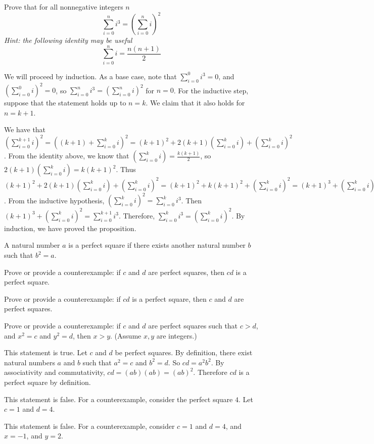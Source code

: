 \documentclass[solution, letterpaper]{cs20}
\begin{document}
Prove that for all nonnegative integers $n$
\[ \sum_{i=0}^{n}i^{3}=\left( \sum_{i=0}^{n}i \right)^{2} \]
{\em Hint: the following identity may be useful}
\[ \sum_{i=0}^ni=\frac{n(n+1)}{2} \]

\begin{solution}
  
We will proceed by induction. As a base case, note that $\sum_{i=0}^0 i^3 = 0$, and 
$\left( \sum_{i=0}^{0}i \right)^{2} = 0$, so $\sum_{i=0}^{n}i^{3}=\left( \sum_{i=0}^{n}i \right)^{2}$ for $n = 0$. For the inductive step, suppose that the statement holds up to $n = k$. We claim that it also holds for $n = k+1$.

We have that $\left( \sum_{i=0}^{k+1}i \right)^{2} = \left((k+1)+ \sum_{i=0}^{k}i \right)^{2} = (k+1)^2 + 2(k+1)(\sum_{i=0}^{k}i) + (\sum_{i=0}^{k}i)^2$. From the identity above, we know that $(\sum_{i=0}^{k}i) = \frac{k(k+1)}{2}$, so $2(k+1)(\sum_{i=0}^{k}i) = k(k+1)^2$. Thus $(k+1)^2 + 2(k+1)(\sum_{i=0}^{k}i) + (\sum_{i=0}^{k}i)^2 = (k+1)^2 + k(k+1)^2 + (\sum_{i=0}^{k}i)^2 = (k+1)^3 + (\sum_{i=0}^{k}i)^2$. From the inductive hypothesis, $(\sum_{i=0}^{k}i)^2 = \sum_{i=0}^{k}i^{3}$. Then $(k+1)^3 + (\sum_{i=0}^{k}i)^2 = \sum_{i=0}^{k+1}i^{3}$. Therefore, $\sum_{i=0}^{k}i^{3}=\left( \sum_{i=0}^{k}i \right)^{2}$. By induction, we have proved the proposition.  
  
\end{solution}

A natural number $a$ is a perfect square if there exists another natural number $b$ such that $b^2 = a$.

\subproblem Prove or provide a counterexample: if $c$ and $d$ are perfect squares, then $cd$ is a perfect square.

\subproblem Prove or provide a counterexample: if $cd$ is a perfect square, then $c$ and $d$ are perfect squares.

\subproblem Prove or provide a counterexample: if $c$ and $d$ are perfect squares such that $c > d$, and $x^2 = c$ and $y^2 = d$, then $x > y$. (Assume $x, y$ are integers.)

\begin{solution}

\subsolution This statement is true. Let $c$ and $d$ be perfect squares. By definition, there exist natural numbers $a$ and $b$ such that $a^2 = c$ and $b^2 = d$. So $cd = a^2b^2$. By associativity and commutativity, $cd = (ab)(ab) = (ab)^2$. Therefore $cd$ is a perfect square by definition.

\subsolution This statement is false. For a counterexample, consider the perfect square $4$. Let $c = 1$ and $d = 4$. 

\subsolution This statement is false. For a counterexample, consider $c = 1$ and $d = 4$, and $x = -1$, and $y = 2$.

\end{solution}
\end{document}
